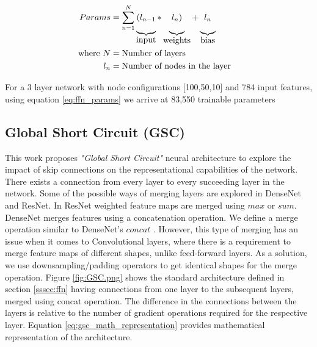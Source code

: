 \documentclass{article}
\begin{document}
\begin{equation}
\label{eq:ffn_params}
\begin{aligned}
Params &= \sum_{n=1}^{N}
\underbrace{(l_{n-1}\rule[-12pt]{0pt}{5pt}}_{\mbox{input}}
*\underbrace{l_{n})\rule[-12pt]{0pt}{5pt}}_{\mbox{weights}}
+\underbrace{l_{n}\rule[-12pt]{0pt}{5pt}}_{\mbox{bias}} &\\
\text{where}~N &= \text{Number of layers} \\
l_{n} &= \text{Number of nodes in the layer}\\
\end{aligned}
\end{equation}

For a 3 layer network with node configurations [100,50,10] and 784 input features, using equation \ref{eq:ffn_params} we arrive at 83,550 trainable parameters


\subsection{Global Short Circuit (GSC)}
This work proposes \emph{"Global Short Circuit"} neural architecture to explore the impact of skip connections on the representational capabilities of the network. There exists a connection from every layer to every succeeding layer in the network. Some of the possible ways of merging layers are explored in DenseNet\cite{Li2018DenselyCC} and ResNet\cite{He2016DeepRL}. In ResNet weighted feature maps are merged using $max$ or $sum$. DenseNet merges features using a concatenation operation. We define a merge operation similar to DenseNet's $concat$ . However, this type of merging has an issue when it comes to Convolutional layers, where there is a requirement to merge feature maps of different shapes, unlike feed-forward layers. As a solution, we use downsampling/padding operators to get identical shapes for the merge operation. Figure \ref{fig:GSC.png} shows the standard architecture defined in section \ref{sssec:ffn} having connections from one layer to the subsequent layers, merged using concat operation. The difference in the connections between the layers is relative to the number of gradient operations required for the respective layer. Equation \ref{eq:gsc_math_representation} provides mathematical representation of the architecture.
\end{document}
